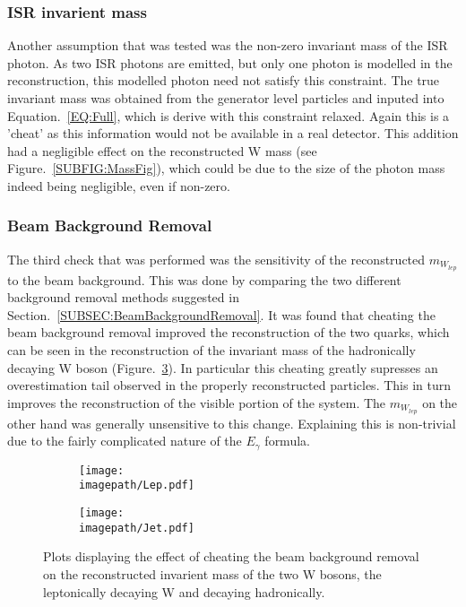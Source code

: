 \subsubsection{ISR invarient mass}
\label{SUBSUBSEC:ISRInvarientMass}
Another assumption that was tested was the non-zero invariant mass of the ISR photon. As two ISR photons are emitted, but only one photon is modelled in the reconstruction, this modelled photon need not satisfy this constraint. The true invariant mass was obtained from the generator level particles and inputed into Equation.~\ref{EQ:Full}, which is derive with this constraint relaxed. Again this is a 'cheat' as this information would not be available in a real detector. This addition had a negligible effect on the reconstructed W mass (see Figure.~\ref{SUBFIG:MassFig}), which could be due to the size of the photon mass indeed being negligible, even if non-zero.

\subsubsection{Beam Background Removal}
\label{SUBSUBSEC:BeamBackground}
The third check that was performed was the sensitivity of the reconstructed ${m}_{W_{lep}}$  to the beam background. This was done by comparing the two different background removal methods suggested in Section.~\ref{SUBSEC:BeamBackgroundRemoval}. It was found that cheating the beam background removal improved the reconstruction of the two quarks, which can be seen in the reconstruction of the invariant mass of the hadronically decaying W boson (Figure.~\ref{FIG:Cheat}). In particular this cheating greatly supresses an overestimation tail observed in the properly reconstructed particles. This in turn improves the reconstruction of the visible portion of the system. The ${m}_{W_{lep}}$ on the other hand was generally unsensitive to this change. Explaining this is non-trivial due to the fairly complicated nature of the $E_{\gamma}$ formula.
\begin{figure}
    \begin{subfigure}[t]{0.45\textwidth}
      \centering
      \texttt{[image: \\imagepath/Lep.pdf]}
      \caption{}
      \label{SUBFIG:CheatLep}
    \end{subfigure}
    \begin{subfigure}[t]{0.45\textwidth}
      \centering
      \texttt{[image: \\imagepath/Jet.pdf]}
      \caption{}
      \label{SUBFIG:CheatHad}
    \end{subfigure}
    \caption{
        Plots displaying the effect of cheating the beam background removal on the reconstructed invarient mass of the two W bosons,
         the leptonically decaying W and  decaying hadronically.
      }
    \label{FIG:Cheat}
\end{figure}

